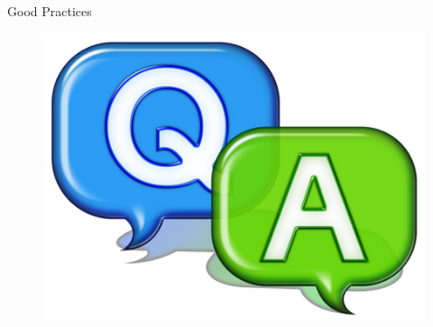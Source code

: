 \documentclass[14pt]{beamer}
\begin{document}
\begin{frame}{Good Practices}
 \begin{figure}[H]
 \begin{center}
  \includegraphics[scale=.3]{qa.png}   
 \end{center}
  \end{figure}
\end{frame}
\end{document}

